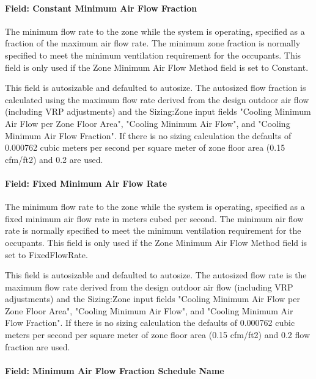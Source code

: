 \paragraph{Field: Constant Minimum Air Flow Fraction}\label{field-constant-minimum-air-flow-fraction-1}

The minimum flow rate to the zone while the system is operating, specified as a fraction of the maximum air flow rate. The minimum zone fraction is normally specified to meet the minimum ventilation requirement for the occupants. This field is only used if the Zone Minimum Air Flow Method field is set to Constant. 

This field is autosizable and defaulted to autosize. The autosized flow fraction is calculated using the maximum flow rate derived from the design outdoor air flow (including VRP adjustments) and the Sizing:Zone input fields "Cooling Minimum Air Flow per Zone Floor Area", "Cooling Minimum Air Flow", and "Cooling Minimum Air Flow Fraction". If there is no sizing calculation the defaults of 0.000762 cubic meters per second per square meter of zone floor area (0.15 cfm/ft2) and 0.2 are used.

\paragraph{Field: Fixed Minimum Air Flow Rate}\label{field-fixed-minimum-air-flow-rate-1}

The minimum flow rate to the zone while the system is operating, specified as a fixed minimum air flow rate in meters cubed per second. The minimum air flow rate is normally specified to meet the minimum ventilation requirement for the occupants. This field is only used if the Zone Minimum Air Flow Method field is set to FixedFlowRate.

This field is autosizable and defaulted to autosize. The autosized flow rate is the maximum flow rate derived from the design outdoor air flow (including VRP adjustments) and the Sizing:Zone input fields "Cooling Minimum Air Flow per Zone Floor Area", "Cooling Minimum Air Flow", and "Cooling Minimum Air Flow Fraction". If there is no sizing calculation the defaults of 0.000762 cubic meters per second per square meter of zone floor area (0.15 cfm/ft2) and 0.2 flow fraction are used.

\paragraph{Field: Minimum Air Flow Fraction Schedule Name}\label{field-minimum-air-flow-fraction-schedule-name-1}

